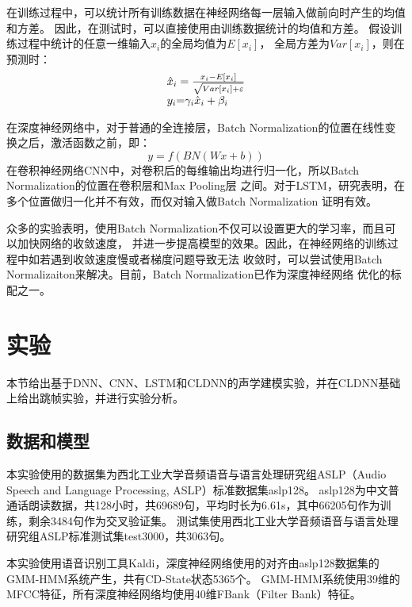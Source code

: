 在训练过程中，可以统计所有训练数据在神经网络每一层输入做前向时产生的均值和方差。
因此，在测试时，可以直接使用由训练数据统计的均值和方差。
假设训练过程中统计的任意一维输入$x_i$的全局均值为$E\left[ {{x_i}} \right]$，
全局方差为$Var[{x_i}]$，则在预测时：
\begin{equation}
\begin{array}{l}
{{\hat x}_i} = \frac{{{x_i} - E\left[ {{x_i}} \right]}}{{\sqrt {Var[{x_i}] + \varepsilon } }}\\
{y_i}{\rm{ = }}{\gamma _i}{{\hat x}_i} + {\beta _i}
\end{array}
\end{equation}

在深度神经网络中，对于普通的全连接层，Batch Normalization的位置在线性变换之后，激活函数之前，即：
\begin{equation}
y = f(BN(Wx + b))
\end{equation}
在卷积神经网络CNN中，对卷积后的每维输出均进行归一化，所以Batch Normalization的位置在卷积层和Max Pooling层
之间。对于LSTM，研究表明，在多个位置做归一化并不有效，而仅对输入做Batch Normalization
证明有效。

众多的实验表明，使用Batch Normalization不仅可以设置更大的学习率，而且可以加快网络的收敛速度，
并进一步提高模型的效果。因此，在神经网络的训练过程中如若遇到收敛速度慢或者梯度问题导致无法
收敛时，可以尝试使用Batch Normalizaiton来解决。目前，Batch Normalization已作为深度神经网络
优化的标配之一。

\section{实验}

本节给出基于DNN、CNN、LSTM和CLDNN的声学建模实验，并在CLDNN基础上给出跳帧实验，并进行实验分析。

\subsection{数据和模型}

本实验使用的数据集为西北工业大学音频语音与语言处理研究组ASLP（Audio Speech and Language Processing, ASLP）标准数据集aslp128。
aslp128为中文普通话朗读数据，共128小时，共69689句，平均时长为6.61s，其中66205句作为训练，剩余3484句作为交叉验证集。
测试集使用西北工业大学音频语音与语言处理研究组ASLP标准测试集test3000，共3063句。

本实验使用语音识别工具Kaldi，深度神经网络使用的对齐由aslp128数据集的GMM-HMM系统产生，共有CD-State状态5365个。
GMM-HMM系统使用39维的MFCC特征，所有深度神经网络均使用40维FBank（Filter Bank）特征。

